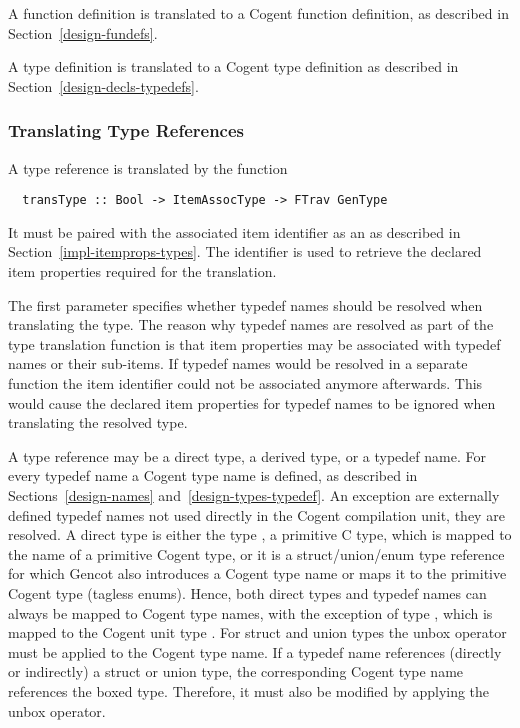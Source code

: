 A function definition is translated to a Cogent function definition, as described in Section~\ref{design-fundefs}.

A type definition is translated to a Cogent type definition as described in Section~\ref{design-decls-typedefs}.

\subsubsection{Translating Type References}

A type reference is translated by the function
\begin{verbatim}
  transType :: Bool -> ItemAssocType -> FTrav GenType
\end{verbatim}
It must be paired with the associated item identifier as an  as described in 
Section~\ref{impl-itemprops-types}. The identifier is used to retrieve the declared item properties required for
the translation.

The first parameter specifies whether typedef names should be resolved when translating the type. 
The reason why typedef names are resolved as part of the type translation function is that item properties may be 
associated with typedef names or their sub-items. If typedef names would
be resolved in a separate function the item identifier could not be associated anymore
afterwards. This would cause the declared item properties for typedef names to be ignored when translating the 
resolved type.

A type reference may be a direct type, a derived type, or a typedef name. For every typedef name a Cogent type
name is defined, as described in Sections~\ref{design-names} and~\ref{design-types-typedef}. An exception are 
externally defined typedef names not used directly in the Cogent compilation unit, they are resolved. A direct type is either
the type , a primitive C type, which is mapped to the name of a primitive Cogent type, or it is a 
struct/union/enum type reference for which Gencot also introduces a Cogent type name or maps it to the 
primitive Cogent type  (tagless enums). Hence, both direct types and typedef names can always be mapped
to Cogent type names, with the exception of type , which is mapped to the Cogent unit type \code{()}.
For struct and union types the unbox operator must be applied to the Cogent type name.
If a typedef name references (directly or indirectly) a struct or union type, the corresponding Cogent
type name references the boxed type. Therefore, it must also be modified by applying the unbox operator. 

